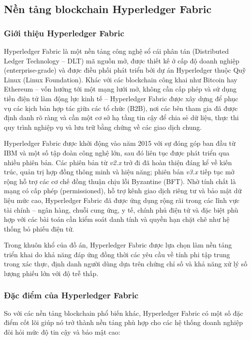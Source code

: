 \subsection{Nền tảng blockchain Hyperledger Fabric}
\label{sec:hyperledger-fabric}

\subsubsection{Giới thiệu Hyperledger Fabric}

Hyperledger Fabric là một nền tảng công nghệ sổ cái phân tán (Distributed Ledger Technology -- DLT) mã nguồn mở, được thiết kế ở cấp độ doanh nghiệp (enterprise-grade) và được điều phối phát triển bởi dự án Hyperledger thuộc Quỹ Linux (Linux Foundation). Khác với các blockchain công khai như Bitcoin hay Ethereum -- vốn hướng tới một mạng lưới mở, không cần cấp phép và sử dụng tiền điện tử làm động lực kinh tế -- Hyperledger Fabric được xây dựng để phục vụ các kịch bản hợp tác giữa các tổ chức (B2B), nơi các bên tham gia đã được định danh rõ ràng và cần một cơ sở hạ tầng tin cậy để chia sẻ dữ liệu, thực thi quy trình nghiệp vụ và lưu trữ bằng chứng về các giao dịch chung.

Hyperledger Fabric được khởi động vào năm 2015 với sự đóng góp ban đầu từ IBM và một số tập đoàn công nghệ lớn, sau đó liên tục được phát triển qua nhiều phiên bản. Các phiên bản từ \textit{v2.x} trở đi đã hoàn thiện đáng kể về kiến trúc, quản trị hợp đồng thông minh và hiệu năng; phiên bản \textit{v3.x} tiếp tục mở rộng hỗ trợ các cơ chế đồng thuận chịu lỗi Byzantine (BFT). Nhờ tính chất là mạng có cấp phép (permissioned), hỗ trợ kênh giao dịch riêng tư và bảo mật dữ liệu mức cao, Hyperledger Fabric đã được ứng dụng rộng rãi trong các lĩnh vực tài chính -- ngân hàng, chuỗi cung ứng, y tế, chính phủ điện tử và đặc biệt phù hợp với các bài toán cần kiểm soát danh tính và quyền hạn chặt chẽ như hệ thống bỏ phiếu điện tử.

Trong khuôn khổ của đồ án, Hyperledger Fabric được lựa chọn làm nền tảng triển khai do khả năng đáp ứng đồng thời các yêu cầu về tính phi tập trung trong xác thực, định danh người dùng dựa trên chứng chỉ số và khả năng xử lý số lượng phiếu lớn với độ trễ thấp.

\subsubsection{Đặc điểm của Hyperledger Fabric}

So với các nền tảng blockchain phổ biến khác, Hyperledger Fabric có một số đặc điểm cốt lõi giúp nó trở thành nền tảng phù hợp cho các hệ thống doanh nghiệp đòi hỏi mức độ tin cậy và bảo mật cao:


